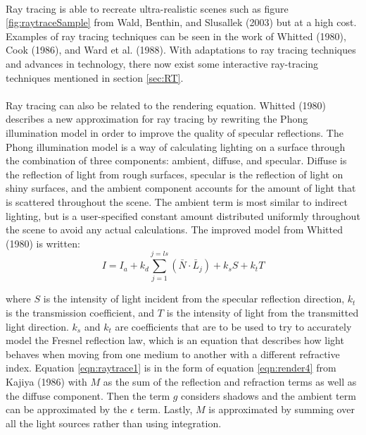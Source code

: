 \paragraph{}
Ray tracing is able to recreate ultra-realistic scenes such as figure \ref{fig:raytraceSample} from Wald, Benthin, and Slusallek (2003) but at a high cost.  Examples of ray tracing techniques can be seen in the work of Whitted (1980), Cook (1986), and Ward et al. (1988).  With adaptations to ray tracing techniques and advances in technology, there now exist some interactive ray-tracing techniques mentioned in section \ref{sec:RT}.

\paragraph{}
Ray tracing can also be related to the rendering equation.  Whitted (1980) describes a new approximation for ray tracing by rewriting the Phong illumination model in order to improve the quality of specular reflections.  The Phong illumination model is a way of calculating lighting on a surface through the combination of three components: ambient, diffuse, and specular.  Diffuse is the reflection of light from rough surfaces, specular is the reflection of light on shiny surfaces, and the ambient component accounts for the amount of light that is scattered throughout the scene.  The ambient term is most similar to indirect lighting, but is a user-specified constant amount distributed uniformly throughout the scene to avoid any actual calculations.  The improved model from Whitted (1980) is written:
\begin{equation}
I = I_{a} + k_{d}\sum_{j=1}^{j=ls}(\bar{N}\cdot\bar{L}_{j})+k_{s}S + k_{t}T \label{eqn:raytrace1}
\end{equation}

where $S$ is the intensity of light incident from the specular reflection direction, $k_{t}$ is the transmission coefficient, and $T$ is the intensity of light from the transmitted light direction. $k_{s}$ and $k_{t}$ are coefficients that are to be used to try to accurately model the Fresnel reflection law, which is an equation that describes how light behaves when moving from one medium to another with a different refractive index.  Equation \ref{eqn:raytrace1} is in the form of equation \ref{eqn:render4} from Kajiya (1986) with $M$ as the sum of the reflection and refraction terms as well as the diffuse component. Then the term $g$ considers shadows and the ambient term can be approximated by the $\epsilon$ term.  Lastly, $M$ is approximated by summing over all the light sources rather than using integration.

